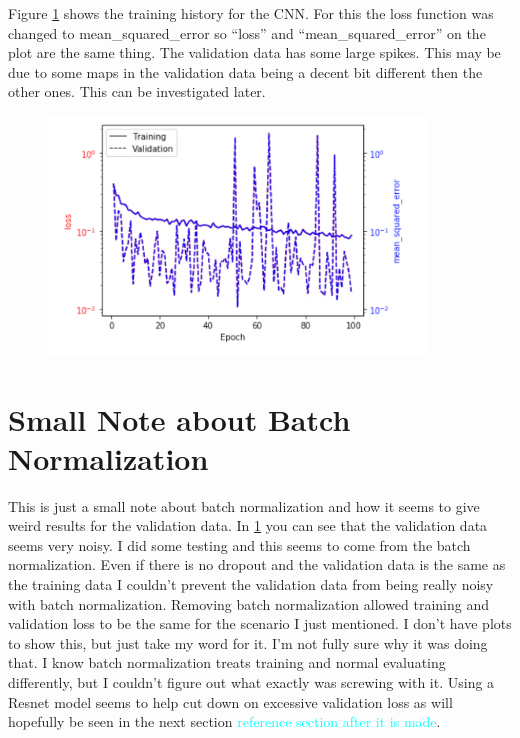 \documentclass{article}
\newcommand{\dnp}[1]{\textcolor{cyan}{#1}}
\begin{document}
		Figure \ref{fig:adam_training} shows the training history for the CNN.  For this the loss function was changed to mean\_squared\_error so ``loss'' and ``mean\_squared\_error'' on the plot are the same thing.  The validation data has some large spikes.  This may be due to some maps in the validation data being a decent bit different then the other ones.  This can be investigated later.

		\begin{figure}[H]
			\centering
			\includegraphics[width=0.9\textwidth]{adam_training.pdf}
			\caption{}
			\label{fig:adam_training}
		\end{figure}

	\section{Small Note about Batch Normalization} \label{sec:batch_norm}
		This is just a small note about batch normalization and how it seems to give weird results for the validation data.  In \cref{fig:adam_training} you can see that the validation data seems very noisy.  I did some testing and this seems to come from the batch normalization.  Even if there is no dropout and the validation data is the same as the training data I couldn't prevent the validation data from being really noisy with batch normalization.  Removing batch normalization allowed training and validation loss to be the same for the scenario I just mentioned.  I don't have plots to show this, but just take my word for it.  I'm not fully sure why it was doing that.  I know batch normalization treats training and normal evaluating differently, but I couldn't figure out what exactly was screwing with it.  Using a Resnet model seems to help cut down on excessive validation loss as will hopefully be seen in the next section \dnp{reference section after it is made}.
\end{document}
